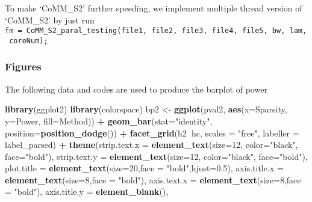 \documentclass[]{article}
\newenvironment{Shaded}{\begin{snugshade}}{\end{snugshade}}
\newcommand{\KeywordTok}[1]{\textcolor[rgb]{0.13,0.29,0.53}{\textbf{#1}}}
\newcommand{\DataTypeTok}[1]{\textcolor[rgb]{0.13,0.29,0.53}{#1}}
\newcommand{\DecValTok}[1]{\textcolor[rgb]{0.00,0.00,0.81}{#1}}
\newcommand{\FloatTok}[1]{\textcolor[rgb]{0.00,0.00,0.81}{#1}}
\newcommand{\StringTok}[1]{\textcolor[rgb]{0.31,0.60,0.02}{#1}}
\newcommand{\OperatorTok}[1]{\textcolor[rgb]{0.81,0.36,0.00}{\textbf{#1}}}
\newcommand{\NormalTok}[1]{#1}
\begin{document}
To make `CoMM\_S2' further speeding, we implement multiple thread
version of `CoMM\_S2' by just run
\texttt{fm\ =\ CoMM\_S2\_paral\_testing(file1,\ file2,\ file3,\ file4,\ file5,\ bw,\ lam,\ coreNum);}

\subsubsection{Figures}\label{figures-1}

The following data and codes are used to produce the barplot of power

\begin{Shaded}
\begin{Highlighting}[]
\KeywordTok{library}\NormalTok{(ggplot2)}
\KeywordTok{library}\NormalTok{(colorspace)}
\NormalTok{bp2 <-}\StringTok{ }\KeywordTok{ggplot}\NormalTok{(pval2, }\KeywordTok{aes}\NormalTok{(}\DataTypeTok{x=}\NormalTok{Sparsity, }\DataTypeTok{y=}\NormalTok{Power, }\DataTypeTok{fill=}\NormalTok{Method)) }\OperatorTok{+}
\StringTok{    }\KeywordTok{geom_bar}\NormalTok{(}\DataTypeTok{stat=}\StringTok{"identity"}\NormalTok{, }\DataTypeTok{position=}\KeywordTok{position_dodge}\NormalTok{()) }\OperatorTok{+}\StringTok{ }
\StringTok{    }\KeywordTok{facet_grid}\NormalTok{(h2}\OperatorTok{~}\NormalTok{hc, }\DataTypeTok{scales =} \StringTok{"free"}\NormalTok{, }\DataTypeTok{labeller =}\NormalTok{ label_parsed)  }\OperatorTok{+}
\StringTok{    }\KeywordTok{theme}\NormalTok{(}\DataTypeTok{strip.text.x =} \KeywordTok{element_text}\NormalTok{(}\DataTypeTok{size=}\DecValTok{12}\NormalTok{, }\DataTypeTok{color=}\StringTok{"black"}\NormalTok{,}
                                      \DataTypeTok{face=}\StringTok{"bold"}\NormalTok{),}
          \DataTypeTok{strip.text.y =} \KeywordTok{element_text}\NormalTok{(}\DataTypeTok{size=}\DecValTok{12}\NormalTok{, }\DataTypeTok{color=}\StringTok{"black"}\NormalTok{,}
                                      \DataTypeTok{face=}\StringTok{"bold"}\NormalTok{),}
          \DataTypeTok{plot.title =} \KeywordTok{element_text}\NormalTok{(}\DataTypeTok{size=}\DecValTok{20}\NormalTok{,}\DataTypeTok{face =} \StringTok{"bold"}\NormalTok{,}\DataTypeTok{hjust=}\FloatTok{0.5}\NormalTok{),}
          \DataTypeTok{axis.title.x =} \KeywordTok{element_text}\NormalTok{(}\DataTypeTok{size=}\DecValTok{8}\NormalTok{,}\DataTypeTok{face =} \StringTok{"bold"}\NormalTok{),}
          \DataTypeTok{axis.text.x =} \KeywordTok{element_text}\NormalTok{(}\DataTypeTok{size=}\DecValTok{8}\NormalTok{,}\DataTypeTok{face =} \StringTok{"bold"}\NormalTok{),}
          \DataTypeTok{axis.title.y =} \KeywordTok{element_blank}\NormalTok{(),}

\end{Highlighting}
\end{Shaded}
\end{document}
